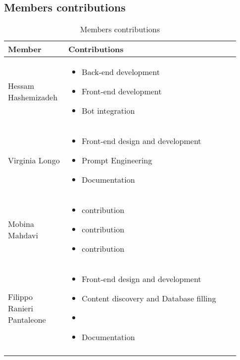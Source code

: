 \subsection{Members contributions}
\begin{longtable}
    {|m{0.23\linewidth}|m{0.7\linewidth}|}
            \hline
            \textbf{Member} & \textbf{Contributions}\\
            \hline
            \endhead
                Hessam Hashemizadeh & \begin{itemize}
                    \item Back-end development
                    \item Front-end development
                    \item Bot integration
                \end{itemize} \\
            \hline
                 Virginia Longo & \begin{itemize}
                    \item Front-end design and development
                    \item Prompt Engineering
                    \item Documentation
                \end{itemize} \\
            \hline
                 Mobina Mahdavi & \begin{itemize}
                    \item contribution
                    \item contribution
                    \item contribution
                \end{itemize} \\
            \hline
                Filippo Ranieri Pantaleone & \begin{itemize}
                    \item Front-end design and development
                    \item Content discovery and Database filling
                    \item \item Documentation
                \end{itemize} \\
            \hline
            \caption{Members contributions}
            \label{table:mem_contributions}
\end{longtable}
